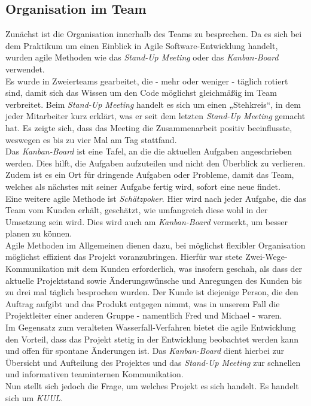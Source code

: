 \documentclass[12pt,twoside]{article}
\theoremstyle{plain}
\theoremstyle{definition}
\theoremstyle{remark}
\begin{document}
\subsection{Organisation im Team}
\label{ssec:orga}
Zunächst ist die Organisation innerhalb des Teams zu besprechen.
Da es sich bei dem Praktikum um einen Einblick in Agile Software-Entwicklung handelt, wurden agile Methoden wie das \textit{Stand-Up Meeting} oder das \textit{Kanban-Board} verwendet.\\
Es wurde in Zweierteams gearbeitet, die - mehr oder weniger - täglich rotiert sind, damit sich das Wissen um den Code möglichst gleichmäßig im Team verbreitet.
Beim \textit{Stand-Up Meeting} handelt es sich um einen „Stehkreis“, in dem jeder Mitarbeiter kurz erklärt, was er seit dem letzten \textit{Stand-Up Meeting} gemacht hat.
Es zeigte sich, dass das Meeting die Zusammenarbeit positiv beeinflusste, weswegen es bis zu vier Mal am Tag stattfand.\\
Das \textit{Kanban-Board} ist eine Tafel, an die die aktuellen Aufgaben angeschrieben werden.
Dies hilft, die Aufgaben aufzuteilen und nicht den Überblick zu verlieren.
Zudem ist es ein Ort für dringende Aufgaben oder Probleme, damit das Team, welches als nächstes mit seiner Aufgabe fertig wird, sofort eine neue findet.\\
Eine weitere agile Methode ist \textit{Schätzpoker}.
Hier wird nach jeder Aufgabe, die das Team vom Kunden erhält, geschätzt, wie umfangreich diese wohl in der Umsetzung sein wird. Dies wird auch am \textit{Kanban-Board} vermerkt, um besser planen zu können.\\
Agile Methoden im Allgemeinen dienen dazu, bei möglichst flexibler Organisation möglichst effizient das Projekt voranzubringen.
Hierfür war stete Zwei-Wege-Kommunikation mit dem Kunden erforderlich, was insofern geschah, als dass der aktuelle Projektstand sowie Änderungswünsche und Anregungen des Kunden bis zu drei mal täglich besprochen wurden.
Der Kunde ist diejenige Person, die den Auftrag aufgibt und das Produkt entgegen nimmt, was in unserem Fall die Projektleiter einer anderen Gruppe - namentlich Fred und Michael - waren.\\
Im Gegensatz zum veralteten Wasserfall-Verfahren bietet die agile Entwicklung den Vorteil, dass das Projekt stetig in der Entwicklung beobachtet werden kann und offen für spontane Änderungen ist.
Das \textit{Kanban-Board} dient hierbei zur Übersicht und Aufteilung des Projektes und das \textit{Stand-Up Meeting} zur schnellen und informativen teaminternen Kommunikation.\\
Nun stellt sich jedoch die Frage, um welches Projekt es sich handelt. Es handelt sich um \textit{KUUL}.
\end{document}
